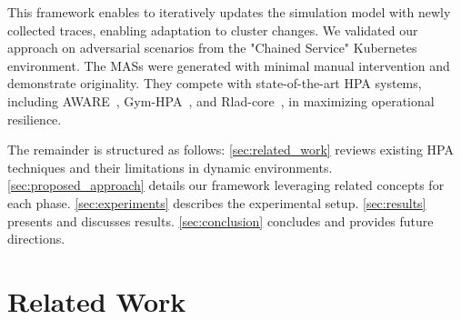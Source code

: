 This framework enables to iteratively updates the simulation model with newly collected traces, enabling adaptation to cluster changes. We validated our approach on adversarial scenarios from the "Chained Service" Kubernetes environment. The MASs were generated with minimal manual intervention and demonstrate originality. They compete with state-of-the-art HPA systems, including AWARE~\cite{aware2023}, Gym-HPA~\cite{gymhpa2022}, and Rlad-core~\cite{Rossi2019}, in maximizing operational resilience.

The remainder is structured as follows:
\autoref{sec:related_work} reviews existing HPA techniques and their limitations in dynamic environments.
\autoref{sec:proposed_approach} details our framework leveraging related concepts for each phase.
\autoref{sec:experiments} describes the experimental setup.
\autoref{sec:results} presents and discusses results.
\autoref{sec:conclusion} concludes and provides future directions.


\section{Related Work}
\label{sec:related_work}

